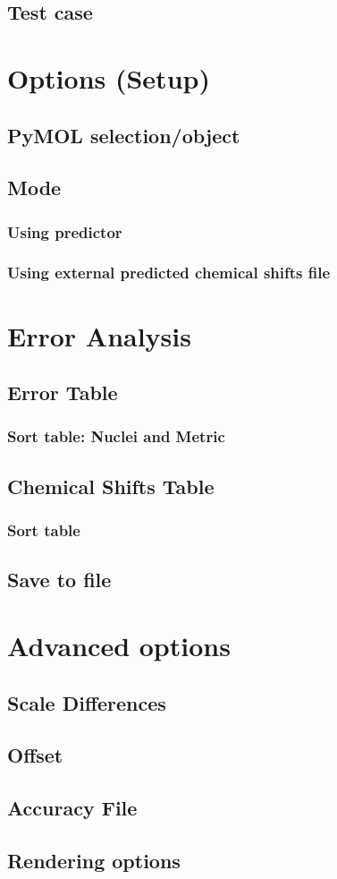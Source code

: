 \documentclass{article}
\begin{document}
\subsection{Test case}


\newpage
\section{Options (Setup)}

\subsection{PyMOL selection/object}
\subsection{Mode}
\subsubsection{Using predictor}
\subsubsection{Using external predicted chemical shifts file}


\newpage
\section{Error Analysis}
\subsection{Error Table}
\subsubsection{Sort table: Nuclei and Metric}
\subsection{Chemical Shifts Table}
\subsubsection{Sort table}
\subsection{Save to file}


\newpage
\section{Advanced options}
\subsection{Scale Differences}
\subsection{Offset}
\subsection{Accuracy File}
\subsection{Rendering options}
\end{document}
